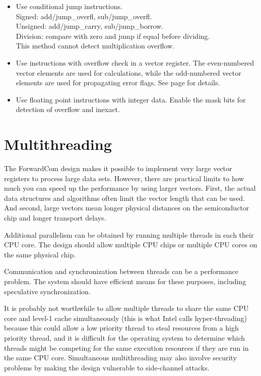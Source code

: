 \documentclass[forwardcom.tex]{subfiles}
\begin{document}
\begin{itemize}
  \item Use conditional jump instructions. \\
    Signed: add/jump\_overfl, sub/jump\_overfl. \\
    Unsigned: add/jump\_carry, sub/jump\_borrow. \\
    Division: compare with zero and jump if equal before dividing. \\
    This method cannot detect multiplication overflow.  
  
  \item Use instructions with overflow check in a vector register. 
    The even-numbered vector elements are used for calculations, while
    the odd-numbered vector elements are used for propagating error flags. 
    See page \pageref{table:addOcInstruction} for details. 
    
  \item Use floating point instructions with integer data. 
    Enable the mask bits for detection of overflow and inexact.
  
\end{itemize}
\vspace{2mm}


\section{Multithreading}
The ForwardCom design makes it possible to implement very large vector registers to process large data sets. However, there are practical limits to how much you can speed up the performance by using larger vectors. First, the actual data structures and algorithms often limit the vector length that can be used. And second, large vectors mean longer physical distances on the semiconductor chip and longer transport delays.
\vspace{2mm}

Additional parallelism can be obtained by running multiple threads in each their CPU core. The design should allow multiple CPU chips or multiple CPU cores on the same physical chip.
\vspace{2mm}

Communication and synchronization between threads can be a performance problem. The system should have efficient means for these purposes, including speculative synchronization.
\vspace{2mm}

It is probably not worthwhile to allow multiple threads to share the same CPU core and level-1 cache simultaneously (this is what Intel calls hyper-threading) because this could allow a low priority thread to steal resources from a high priority thread, and it is difficult for the operating system to determine which threads might be competing for the same execution resources if they are run in the same CPU core. Simultaneous multithreading may also involve security problems by making the design vulnerable to side-channel attacks.
\vspace{2mm}
\end{document}
